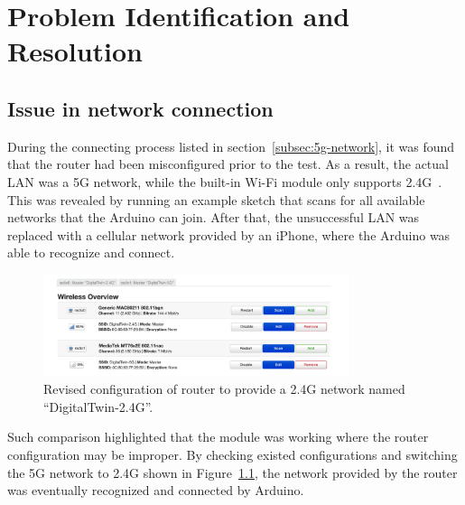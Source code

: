 \chapter{Problem Identification and Resolution}


\section{Issue in network connection}

During the connecting process listed in section~\ref{subsec:5g-network}, it was found that the router had been misconfigured prior to the test.
As a result, the actual LAN was a 5G network, while the built-in Wi-Fi module only supports 2.4G~\cite{arduino_nina_w10_datasheet}.
This was revealed by running an example sketch that scans for all available networks that the Arduino can join.
After that, the unsuccessful LAN was replaced with a cellular network provided by an iPhone, where the Arduino was able to recognize and connect.

\begin{figure}[htbp]
	\centering
	\includegraphics[width=0.8\textwidth]{
		fileForWriting/config}
	\caption[Revised configuration of router]{Revised configuration of router to provide a 2.4G network named ``DigitalTwin-2.4G''.}
	\label{fig:config-5G}
\end{figure}

Such comparison highlighted that the module was working where the router configuration may be improper.
By checking existed configurations and switching the 5G network to 2.4G shown in Figure~\ref{fig:config-5G}, the network provided by the router was eventually recognized and connected by Arduino.

